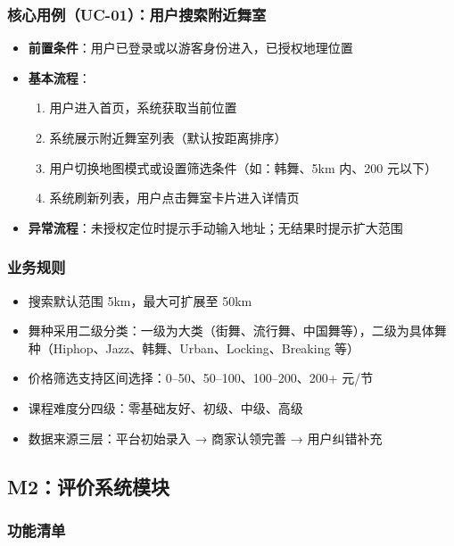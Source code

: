 \documentclass[12pt,a4paper]{ctexart}
\begin{document}
\subsubsection{核心用例（UC-01）：用户搜索附近舞室}

\begin{itemize}
    \item \textbf{前置条件}：用户已登录或以游客身份进入，已授权地理位置
    \item \textbf{基本流程}：
    \begin{enumerate}
        \item 用户进入首页，系统获取当前位置
        \item 系统展示附近舞室列表（默认按距离排序）
        \item 用户切换地图模式或设置筛选条件（如：韩舞、5km 内、200 元以下）
        \item 系统刷新列表，用户点击舞室卡片进入详情页
    \end{enumerate}
    \item \textbf{异常流程}：未授权定位时提示手动输入地址；无结果时提示扩大范围
\end{itemize}

\subsubsection{业务规则}

\begin{itemize}
    \item 搜索默认范围 5km，最大可扩展至 50km
    \item 舞种采用二级分类：一级为大类（街舞、流行舞、中国舞等），二级为具体舞种（Hiphop、Jazz、韩舞、Urban、Locking、Breaking 等）
    \item 价格筛选支持区间选择：0--50、50--100、100--200、200+ 元/节
    \item 课程难度分四级：零基础友好、初级、中级、高级
    \item 数据来源三层：平台初始录入 → 商家认领完善 → 用户纠错补充
\end{itemize}

\subsection{M2：评价系统模块}

\subsubsection{功能清单}
\end{document}
